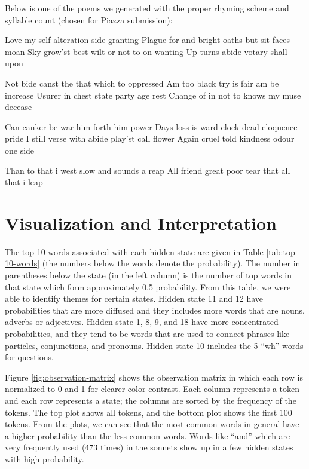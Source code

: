 Below is one of the poems we generated with the proper rhyming scheme and syllable count (chosen for Piazza submission):

\begin{poem}
\begin{stanza}
Love my self alteration side granting \verseline
Plague for and bright oaths but sit faces moan \verseline
Sky grow'st best wilt or not to on wanting \verseline
Up turns abide votary shall upon
\end{stanza}
\begin{stanza}
Not bide canst the that which to oppressed \verseline
Am too black try is fair am be increase \verseline
Usurer in chest state party age rest \verseline
Change of in not to knows my muse decease 
\end{stanza}
\begin{stanza}
Can canker be war him forth him power \verseline
Days loss is ward clock dead eloquence pride \verseline
I still verse with abide play'st call flower \verseline
Again cruel told kindness odour one side  \end{stanza}
\begin{stanza}
Than to that i west slow and sounds a reap \verseline
All friend great poor tear that all that i leap \end{stanza}
\end{poem}

\section{Visualization and Interpretation}

The top 10 words associated with each hidden state are given in Table \ref{tab:top-10-words} (the numbers below the words denote the probability). The number in parentheses below the state (in the left column) is the number of top words in that state which form approximately 0.5 probability. From this table, we were able to identify themes for certain states. Hidden state 11 and 12 have probabilities that are more diffused and they includes more words that are nouns, adverbs or adjectives. Hidden state 1, 8, 9, and 18 have more concentrated probabilities, and they tend to be words that are used to connect phrases like particles, conjunctions, and pronouns. Hidden state 10 includes the 5 ``wh'' words for questions. 

Figure \ref{fig:observation-matrix} shows the observation matrix in which each row is normalized to 0 and 1 for clearer color contrast. Each column represents a token and each row represents a state; the columns are sorted by the frequency of the tokens. The top plot shows all tokens, and the bottom plot shows the first 100 tokens. From the plots, we can see that the most common words in general have a higher probability than the less common words. Words like ``and'' which are very frequently used (473 times) in the sonnets show up in a few hidden states with high probability.

